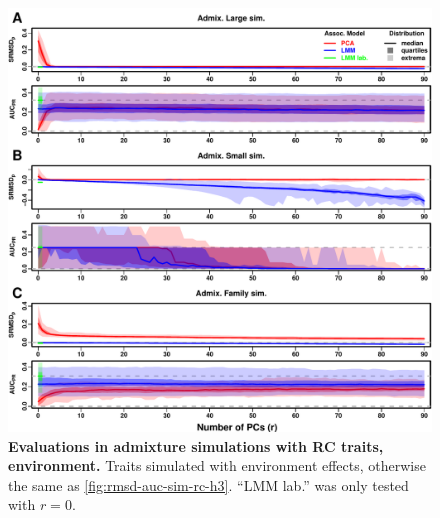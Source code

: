 \documentclass[11pt]{article}
\begin{document}
\begin{figure}[hp!]
  \centering
  \includegraphics[width=\textwidth,height=\textheight,keepaspectratio]{m_causal_fac-27/h0.3/env0.3-0.2/rmsd-auc-sim.pdf}
  \caption{
    {\bf Evaluations in admixture simulations with RC traits, environment.}
    Traits simulated with environment effects, otherwise the same as \cref{fig:rmsd-auc-sim-rc-h3}.
    ``LMM lab.'' was only tested with $r=0$.
  }
  \label{fig:rmsd-auc-sim-rc-env}
\end{figure}
\end{document}
